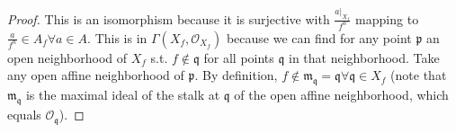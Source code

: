 \begin{exercise}
\begin{enumerate}[(a)]
\begin{proof}
		This is an isomorphism because it is surjective with $\frac{a|_{X_f}}{f^n} $ mapping to $\frac{a}{f^n} \in A_f \forall a\in A$.
		This is in $\Gamma(X_f,\mathcal{O}_{X_f}) $ because we can find for any point $\mathfrak{p} $ an open neighborhood of $X_f $ s.t. $f\notin \mathfrak{q}$ for all points $\mathfrak{q} $ in that neighborhood.
		Take any open affine neighborhood of $\mathfrak{p} $.
		By definition, $f\notin \mathfrak{m}_{\mathfrak{q}} = \mathfrak{q} \forall \mathfrak{q}\in X_f$ (note that $\mathfrak{m}_{\mathfrak{q}} $ is the maximal ideal of the stalk at $\mathfrak{q} $ of the open affine neighborhood, which equals $\mathcal{O}_ \mathfrak{q} $).
	\end{proof}
\end{enumerate}
\end{exercise}

